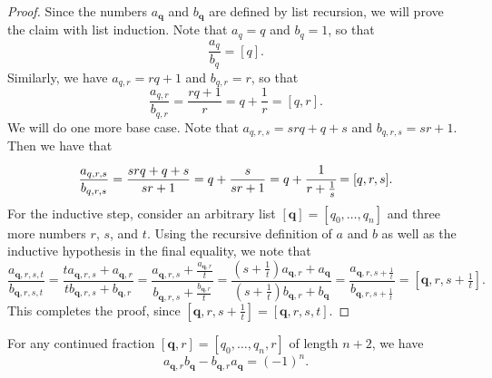 \begin{proof}
  Since the numbers $a_{\symbf{q}}$ and $b_{\symbf{q}}$ are defined by list recursion, we will prove the claim with list induction. Note that $a_q=q$ and $b_q=1$, so that
  \begin{equation*}
    \frac{a_q}{b_q}=[q].
  \end{equation*}
  Similarly, we have $a_{q,r}=rq+1$ and $b_{q,r}=r$, so that
  \begin{equation*}
    \frac{a_{q,r}}{b_{q,r}}=\frac{rq+1}{r}=q+\frac{1}{r}=[q,r].
  \end{equation*}
  We will do one more base case. Note that $a_{q,r,s}=srq+q+s$ and $b_{q,r,s}=sr+1$. Then we have that
  \begin{equation*}
    \frac{a_{q,r,s}}{b_{q,r,s}}=\frac{srq+q+s}{sr+1}=q+\frac{s}{sr+1}=q+\cfrac{1}{r+\tfrac{1}{s}}=[q,r,s].
  \end{equation*}
  For the inductive step, consider an arbitrary list $[\symbf{q}]=[q_0,\ldots,q_n]$ and three more numbers $r$, $s$, and $t$. Using the recursive definition of $a$ and $b$ as well as the inductive hypothesis in the final equality, we note that
  \begin{equation*}
    \frac{a_{\symbf{q},r,s,t}}{b_{\symbf{q},r,s,t}}=
    \frac{ta_{\symbf{q},r,s}+a_{\symbf{q},r}}{tb_{\symbf{q},r,s}+b_{\symbf{q},r}} =
    \frac{a_{\symbf{q},r,s}+\frac{a_{\symbf{q},r}}{t}}{b_{\symbf{q},r,s}+\frac{b_{\symbf{q},r}}{t}} =
    \frac{(s+\frac{1}{t})a_{\symbf{q},r}+a_{\symbf{q}}}{(s+\frac{1}{t})b_{\symbf{q},r}+b_{\symbf{q}}} =
    \frac{a_{\symbf{q},r,s+\frac{1}{t}}}{b_{\symbf{q},r,s+\frac{1}{t}}} =
    [\symbf{q},r,s+\tfrac{1}{t}].
  \end{equation*}
  This completes the proof, since $[\symbf{q},r,s+\tfrac{1}{t}] = [\symbf{q},r,s,t]$.
\end{proof}

\begin{theorem}\label{theorem:determinant-formula-convergents}
  For any continued fraction $[\symbf{q},r]=[q_0,\ldots,q_n,r]$ of length $n+2$, we have
  \begin{equation*}
    a_{\symbf{q},r}b_{\symbf{q}}-b_{\symbf{q},r}a_{\symbf{q}}=(-1)^n.
  \end{equation*}
\end{theorem}

